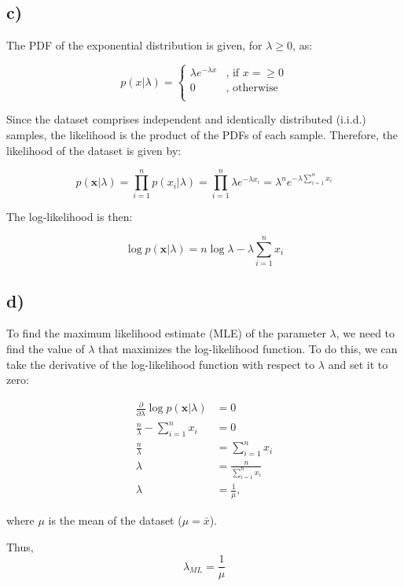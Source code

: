 \documentclass[12pt,a4paper,oneside]{paper}
\begin{document}
\subsection*{c)}

The PDF of the exponential distribution is given, for $\lambda \geq 0$, as: 

\begin{equation}
p(x | \lambda) =
\begin{cases}
\lambda e^{-\lambda x} & \text{, if } x = \geq 0 \\
0 & \text{, otherwise} \\ 
\end{cases} 
\end{equation}

Since the dataset comprises independent and identically distributed (i.i.d.) samples, the likelihood is the product of the PDFs of each sample. Therefore, the likelihood of the dataset is given by:

\[
p(\bm{x} | \lambda) = \prod_{i=1}^{n} p(x_i | \lambda) = \prod_{i=1}^{n} \lambda e^{-\lambda x_i} = \lambda^n e^{-\lambda \sum_{i=1}^{n} x_i}
\]

The log-likelihood is then:

\[
\log p(\bm{x} | \lambda) = n \log \lambda - \lambda \sum_{i=1}^{n} x_i
\]

\newpage
\subsection*{d)}

To find the maximum likelihood estimate (MLE) of the parameter \( \lambda \), we need to find the value of \( \lambda \) that maximizes the log-likelihood function. To do this, we can take the derivative of the log-likelihood function with respect to \( \lambda \) and set it to zero:

\begin{align*}
\frac{\partial}{\partial \lambda} \log p(\bm{x} | \lambda) &= 0 \\
\frac{n}{\lambda} - \sum_{i=1}^{n} x_i &= 0 \\
\frac{n}{\lambda} &= \sum_{i=1}^{n} x_i \\
\lambda &= \frac{n}{\sum_{i=1}^{n} x_i} \\
\lambda &= \frac{1}{\mu},
\end{align*}

where \( \mu \) is the mean of the dataset ($\mu = \bar{x}$).

Thus, 
$$
\lambda_{ML} = \frac{1}{\mu}
$$
\end{document}
